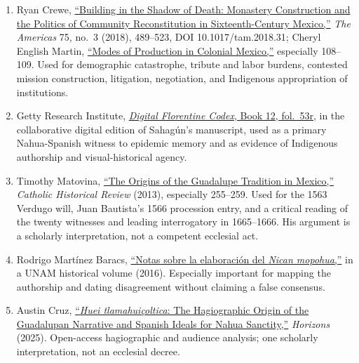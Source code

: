 \begin{enumerate}
  \item Ryan Crewe, \href{https://www.cambridge.org/core/journals/americas/article/building-in-the-shadow-of-death-monastery-construction-and-the-politics-of-community-reconstitution-in-sixteenthcentury-mexico/D80E0FD9A9F7C3F90670A6025283C339}{“Building in the Shadow of Death: Monastery Construction and the Politics of Community Reconstitution in Sixteenth-Century Mexico,”} \emph{The Americas} 75, no.~3 (2018), 489--523, DOI 10.1017/tam.2018.31; Cheryl English Martin, \href{https://novohispana.historicas.unam.mx/index.php/ehn/article/download/3356/2911/3307}{“Modes of Production in Colonial Mexico,”} especially 108--109. Used for demographic catastrophe, tribute and labor burdens, contested mission construction, litigation, negotiation, and Indigenous appropriation of institutions.

  \item Getty Research Institute, \href{https://florentinecodex.getty.edu/es/book/12/folio/53r}{\emph{Digital Florentine Codex}, Book 12, fol.~53r}, in the collaborative digital edition of Sahagún's manuscript, used as a primary Nahua-Spanish witness to epidemic memory and as evidence of Indigenous authorship and visual-historical agency.

  \item Timothy Matovina, \href{https://culturasvisuales.org/wp-content/uploads/2017/02/the-origins-of-the-guadalupe-tradition-in-mexico.pdf}{“The Origins of the Guadalupe Tradition in Mexico,”} \emph{Catholic Historical Review} (2013), especially 255--259. Used for the 1563 Verdugo will, Juan Bautista's 1566 procession entry, and a critical reading of the twenty witnesses and leading interrogatory in 1665--1666. His argument is a scholarly interpretation, not a competent ecclesial act.

  \item Rodrigo Martínez Baracs, \href{https://historicas.unam.mx/publicaciones/publicadigital/libros/homenaje/04_14_notas_elaboracion.pdf}{“Notas sobre la elaboración del \emph{Nican mopohua},”} in a UNAM historical volume (2016). Especially important for mapping the authorship and dating disagreement without claiming a false consensus.

  \item Austin Cruz, \href{https://www.cambridge.org/core/journals/horizons/article/huei-tlamahuicoltica-the-hagiographic-origin-of-the-guadalupan-narrative-and-spanish-ideals-for-nahua-sanctity/07CE77AEEDD8A1FB69EB86B5BD5264F1}{“\emph{Huei tlamahuiçoltica}: The Hagiographic Origin of the Guadalupan Narrative and Spanish Ideals for Nahua Sanctity,”} \emph{Horizons} (2025). Open-access hagiographic and audience analysis; one scholarly interpretation, not an ecclesial decree.


\end{enumerate}
